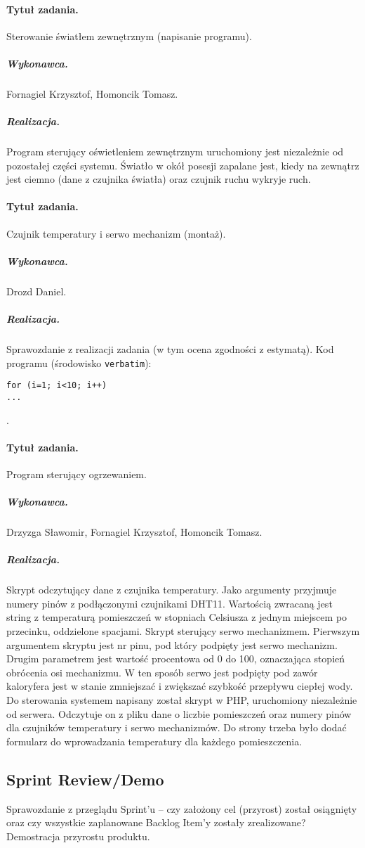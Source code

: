\paragraph{Tytuł zadania.} Sterowanie światłem zewnętrznym (napisanie programu).
\subparagraph{Wykonawca.} Fornagiel Krzysztof, Homoncik Tomasz.
\subparagraph{Realizacja.} Program sterujący oświetleniem zewnętrznym uruchomiony jest niezależnie od pozostałej części systemu. Światło w okół posesji zapalane jest, kiedy na zewnątrz jest ciemno (dane z czujnika światła) oraz czujnik ruchu wykryje ruch.

\paragraph{Tytuł zadania.} Czujnik temperatury i serwo mechanizm (montaż).
\subparagraph{Wykonawca.} Drozd Daniel.
\subparagraph{Realizacja.} Sprawozdanie z realizacji zadania (w tym ocena zgodności z estymatą). Kod programu (środowisko \texttt{verbatim}): \begin{verbatim}
for (i=1; i<10; i++)
...
\end{verbatim}.

\paragraph{Tytuł zadania.} Program sterujący ogrzewaniem.
\subparagraph{Wykonawca.} Drzyzga Sławomir, Fornagiel Krzysztof, Homoncik Tomasz.
\subparagraph{Realizacja.} Skrypt odczytujący dane z czujnika temperatury. Jako argumenty przyjmuje numery pinów z podłączonymi czujnikami DHT11. Wartością zwracaną jest string z temperaturą pomieszczeń w stopniach Celsiusza z jednym miejscem po przecinku, oddzielone spacjami. 
\break
Skrypt sterujący serwo mechanizmem. Pierwszym argumentem skryptu jest nr pinu, pod który podpięty jest serwo mechanizm. Drugim parametrem jest wartość procentowa od 0 do 100, oznaczająca stopień obrócenia osi mechanizmu. W ten sposób serwo jest podpięty pod zawór kaloryfera jest w stanie zmniejszać i zwiększać szybkość przepływu ciepłej wody.
\break
Do sterowania systemem napisany został skrypt w PHP, uruchomiony niezależnie od serwera. Odczytuje on z pliku dane o liczbie pomieszczeń oraz numery pinów dla czujników temperatury i serwo mechanizmów.
Do strony trzeba było dodać formularz do wprowadzania temperatury dla każdego pomieszczenia.



\subsection{Sprint Review/Demo}
Sprawozdanie z przeglądu Sprint'u -- czy założony cel (przyrost) został osiągnięty oraz czy wszystkie zaplanowane Backlog Item'y zostały zrealizowane? Demostracja przyrostu produktu.
